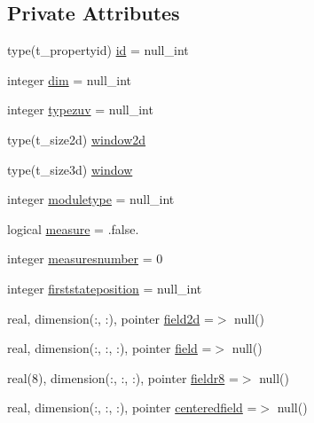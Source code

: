 \subsection*{Private Attributes}
\begin{DoxyCompactItemize}
\item 
type(t\+\_\+propertyid) \mbox{\hyperlink{structmodulesequentialassimilation_1_1t__property_a5705fa8b652b826037ff95cccbca83df}{id}} = null\+\_\+int
\item 
integer \mbox{\hyperlink{structmodulesequentialassimilation_1_1t__property_a7e2f64e2ecab958936afc1bd385306ba}{dim}} = null\+\_\+int
\item 
integer \mbox{\hyperlink{structmodulesequentialassimilation_1_1t__property_a54161250233da26e6e620106e806fa25}{typezuv}} = null\+\_\+int
\item 
type(t\+\_\+size2d) \mbox{\hyperlink{structmodulesequentialassimilation_1_1t__property_af709780a59ca798fd9130d48fde0a88b}{window2d}}
\item 
type(t\+\_\+size3d) \mbox{\hyperlink{structmodulesequentialassimilation_1_1t__property_ae6f963fd0b88c9c08f7cba98c40f2db4}{window}}
\item 
integer \mbox{\hyperlink{structmodulesequentialassimilation_1_1t__property_adf34ceda33b54e2bd560bc9f57b47045}{moduletype}} = null\+\_\+int
\item 
logical \mbox{\hyperlink{structmodulesequentialassimilation_1_1t__property_a34ea3068275f13138a4a636cfce6875b}{measure}} = .false.
\item 
integer \mbox{\hyperlink{structmodulesequentialassimilation_1_1t__property_a2fc277ce8255ad7c4d3e55afbb55e158}{measuresnumber}} = 0
\item 
integer \mbox{\hyperlink{structmodulesequentialassimilation_1_1t__property_a5838afff975d406de119cb3934c3f353}{firststateposition}} = null\+\_\+int
\item 
real, dimension(\+:, \+:), pointer \mbox{\hyperlink{structmodulesequentialassimilation_1_1t__property_a4106dd47869288f106aaee3e82a9b002}{field2d}} =$>$ null()
\item 
real, dimension(\+:, \+:, \+:), pointer \mbox{\hyperlink{structmodulesequentialassimilation_1_1t__property_a1c9f0ea7baf27673af4e04cc9f67905d}{field}} =$>$ null()
\item 
real(8), dimension(\+:, \+:, \+:), pointer \mbox{\hyperlink{structmodulesequentialassimilation_1_1t__property_a8c284af1e11ed1f181d5311b57f55d83}{fieldr8}} =$>$ null()
\item 
real, dimension(\+:, \+:, \+:), pointer \mbox{\hyperlink{structmodulesequentialassimilation_1_1t__property_ac348d16ae3bbd051764f592b6cff47f9}{centeredfield}} =$>$ null()

\end{DoxyCompactItemize}
